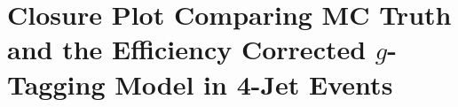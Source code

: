 \clearpage


\FloatBarrier
\section[Closure Plot for g-Tagging Model in 4-Jet Events]{Closure Plot Comparing MC Truth and the Efficiency Corrected $g$-Tagging Model in 4-Jet Events}

